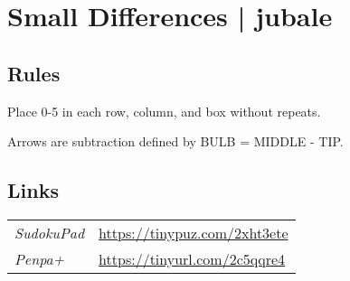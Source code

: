 \section[Small Differences | jubale {[\emph{Sudoku, Subtraction Arrows}]}]{Small Differences | {\normalfont jubale}}
\label{sec:31-small-differences-jubale}

\subsection*{Rules}
\begin{markdown}
Place 0-5 in each row, column, and box without repeats.

Arrows are subtraction defined by BULB = MIDDLE - TIP.
\end{markdown}
\subsection*{Links}
\begin{tabularx}{\textwidth}{l X}
\emph{SudokuPad} & \url{https://tinypuz.com/2xht3ete} \\
\emph{Penpa+} & \url{https://tinyurl.com/2c5qqre4} \\
\end{tabularx}
\pagebreak
